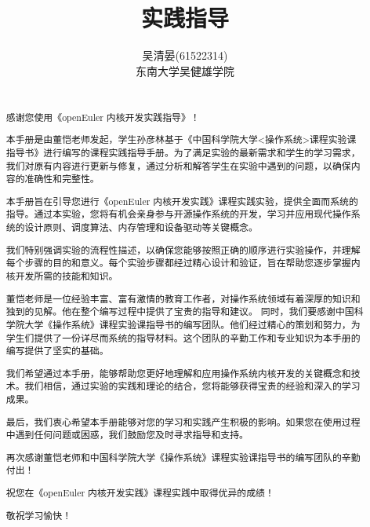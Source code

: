 \documentclass{article}
\title{实践指导}
\author{吴清晏(61522314) \\ 东南大学吴健雄学院}
\date{}
\begin{document}
\maketitle

\newpage
\renewcommand{\abstractname}{\LARGE\textbf{前言}}
\begin{abstract}\large

    ~\\
      感谢您使用《openEuler 内核开发实践指导》！

    本手册是由董恺老师发起，学生孙彦林基于《中国科学院大学<操作系统>课程实验课指导书》进行编写的课程实践指导手册。为了满足实验的最新需求和学生的学习需求，我们对原有内容进行更新与修复，通过分析和解答学生在实验中遇到的问题，以确保内容的准确性和完整性。

    本手册旨在引导您进行《openEuler 内核开发实践》课程实践实验，提供全面而系统的指导。通过本实验，您将有机会亲身参与开源操作系统的开发，学习并应用现代操作系统的设计原则、调度算法、内存管理和设备驱动等关键概念。

    我们特别强调实验的流程性描述，以确保您能够按照正确的顺序进行实验操作，并理解每个步骤的目的和意义。每个实验步骤都经过精心设计和验证，旨在帮助您逐步掌握内核开发所需的技能和知识。

    董恺老师是一位经验丰富、富有激情的教育工作者，对操作系统领域有着深厚的知识和独到的见解。他在整个编写过程中提供了宝贵的指导和建议。 同时，我们要感谢中国科学院大学《操作系统》课程实验课指导书的编写团队。他们经过精心的策划和努力，为学生们提供了一份详尽而系统的指导材料。这个团队的辛勤工作和专业知识为本手册的编写提供了坚实的基础。

    我们希望通过本手册，能够帮助您更好地理解和应用操作系统内核开发的关键概念和技术。我们相信，通过实验的实践和理论的结合，您将能够获得宝贵的经验和深入的学习成果。

    最后，我们衷心希望本手册能够对您的学习和实践产生积极的影响。如果您在使用过程中遇到任何问题或困惑，我们鼓励您及时寻求指导和支持。

    再次感谢董恺老师和中国科学院大学《操作系统》课程实验课指导书的编写团队的辛勤付出！

    祝您在《openEuler 内核开发实践》课程实践中取得优异的成绩！

    敬祝学习愉快！
\end{abstract}

\newpage
\begin{center}
 \tableofcontents   
\end{center}

\newpage
\end{document}
